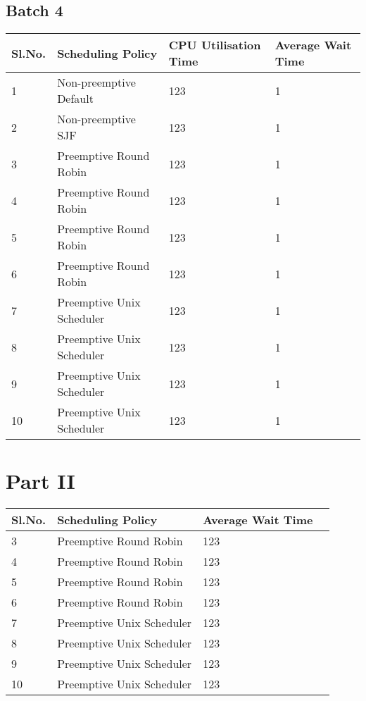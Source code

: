 \documentclass{article}
\begin{document}
\subsection{Batch 4}
\begin{center}
    \begin{tabular}{| l | l | l | l |}
    \hline
    Sl.No. & Scheduling Policy & CPU Utilisation Time & Average Wait Time \\ \hline
    1 & Non-preemptive Default & 123 & 1 \\
    2 & Non-preemptive SJF & 123 & 1 \\
    3 & Preemptive Round Robin & 123 & 1 \\
    4 & Preemptive Round Robin & 123 & 1 \\
    5 & Preemptive Round Robin & 123 & 1 \\
    6 & Preemptive Round Robin & 123 & 1 \\
    7 & Preemptive Unix Scheduler & 123 & 1 \\
    8 & Preemptive Unix Scheduler & 123 & 1 \\
    9 & Preemptive Unix Scheduler & 123 & 1 \\
    10 & Preemptive Unix Scheduler & 123 & 1 \\
    \hline
    \end{tabular}
\end{center}
\section{Part II}
\begin{center}
    \begin{tabular}{| l | l | l | l |}
    \hline
    Sl.No. & Scheduling Policy & Average Wait Time \\ \hline
    3 & Preemptive Round Robin & 123 \\
    4 & Preemptive Round Robin & 123 \\
    5 & Preemptive Round Robin & 123 \\
    6 & Preemptive Round Robin & 123 \\
    7 & Preemptive Unix Scheduler & 123 \\
    8 & Preemptive Unix Scheduler & 123 \\
    9 & Preemptive Unix Scheduler & 123 \\
    10 & Preemptive Unix Scheduler & 123 \\
    \hline
    \end{tabular}
\end{center}
\end{document}
